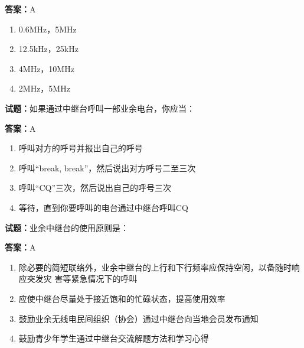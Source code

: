 \documentclass{ctexbook}
\begin{document}
\textbf{答案：}A 

\begin{enumerate}[leftmargin=3em]
  \item 0.6MHz，5MHz 

  \item 12.5kHz，25kHz 

  \item 4MHz，10MHz 

  \item 2MHz，5MHz 

\end{enumerate}





\vspace{1em}

\textbf{试题：}如果通过中继台呼叫一部业余电台，你应当： 

\textbf{答案：}A 

\begin{enumerate}[leftmargin=3em]
  \item 呼叫对方的呼号并报出自己的呼号 

  \item 呼叫“break, break”，然后说出对方呼号二至三次 

  \item 呼叫“CQ”三次，然后说出自己的呼号三次 

  \item 等待，直到你要呼叫的电台通过中继台呼叫CQ 

\end{enumerate}





\vspace{1em}

\textbf{试题：}业余中继台的使用原则是： 

\textbf{答案：}A 

\begin{enumerate}[leftmargin=3em]
  \item 除必要的简短联络外，业余中继台的上行和下行频率应保持空闲，以备随时响应突发灾
害等紧急情况下的呼叫 

  \item 应使中继台尽量处于接近饱和的忙碌状态，提高使用效率 

  \item 鼓励业余无线电民间组织（协会）通过中继台向当地会员发布通知 

  \item 鼓励青少年学生通过中继台交流解题方法和学习心得 

\end{enumerate}
\end{document}

